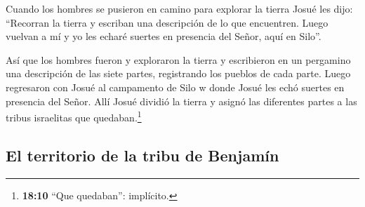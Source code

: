  Cuando los hombres se pusieron en camino para explorar la
tierra Josué les dijo: ``Recorran la tierra y escriban una descripción
de lo que encuentren. Luego vuelvan a mí y yo les echaré suertes en
presencia del Señor, aquí en Silo''.

 Así que los hombres fueron y exploraron la tierra y
escribieron en un pergamino una descripción de las siete partes,
registrando los pueblos de cada parte. Luego regresaron con Josué al
campamento de Silo  w donde Josué les echó suertes en
presencia del Señor. Allí Josué dividió la tierra y asignó las
diferentes partes a las tribus israelitas que quedaban.\footnote{\textbf{18:10}
  ``Que quedaban'': implícito.}

\hypertarget{el-territorio-de-la-tribu-de-benjamuxedn}{%
\subsection{El territorio de la tribu de
Benjamín}\label{el-territorio-de-la-tribu-de-benjamuxedn}}

